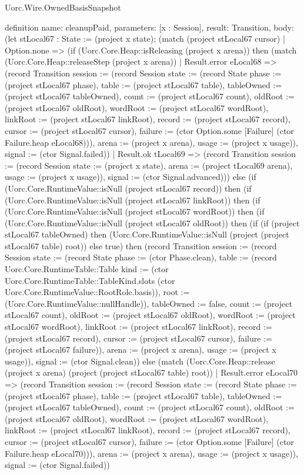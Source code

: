 \begin{lexlean}{Uorc.Wire.OwnedBasisSnapshot}
\begin{semanticmodule}
definition{
  name: cleanupPaid,
  parameters: [x : Session],
  result: Transition,
  body: (let stLocal67 : State := (project x state); (match (project stLocal67 cursor)
    | Option.none => (if (Uorc.Core.Heap::isReleasing (project x arena)) then (match (Uorc.Core.Heap::releaseStep (project x arena))
      | Result.error eLocal68 => (record Transition {session := (record Session {state := (record State {phase := (project stLocal67 phase), table := (project stLocal67 table), tableOwned := (project stLocal67 tableOwned), count := (project stLocal67 count), oldRoot := (project stLocal67 oldRoot), wordRoot := (project stLocal67 wordRoot), linkRoot := (project stLocal67 linkRoot), record := (project stLocal67 record), cursor := (project stLocal67 cursor), failure := (ctor Option.some [Failure] (ctor Failure.heap eLocal68))}), arena := (project x arena), usage := (project x usage)}), signal := (ctor Signal.failed)})
      | Result.ok tLocal69 => (record Transition {session := (record Session {state := (project x state), arena := (project tLocal69 arena), usage := (project x usage)}), signal := (ctor Signal.advanced)})) else (if (Uorc.Core.RuntimeValue::isNull (project stLocal67 record)) then (if (Uorc.Core.RuntimeValue::isNull (project stLocal67 linkRoot)) then (if (Uorc.Core.RuntimeValue::isNull (project stLocal67 wordRoot)) then (if (Uorc.Core.RuntimeValue::isNull (project stLocal67 oldRoot)) then (if (if (project stLocal67 tableOwned) then (Uorc.Core.RuntimeValue::isNull (project (project stLocal67 table) root)) else true) then (record Transition {session := (record Session {state := (record State {phase := (ctor Phase.clean), table := (record Uorc.Core.RuntimeTable::Table {kind := (ctor Uorc.Core.RuntimeTable::TableKind.slots (ctor Uorc.Core.RuntimeValue::RootRole.basis)), root := (Uorc.Core.RuntimeValue::nullHandle)}), tableOwned := false, count := (project stLocal67 count), oldRoot := (project stLocal67 oldRoot), wordRoot := (project stLocal67 wordRoot), linkRoot := (project stLocal67 linkRoot), record := (project stLocal67 record), cursor := (project stLocal67 cursor), failure := (project stLocal67 failure)}), arena := (project x arena), usage := (project x usage)}), signal := (ctor Signal.clean)}) else (match (Uorc.Core.Heap::release (project x arena) (project (project stLocal67 table) root))
      | Result.error eLocal70 => (record Transition {session := (record Session {state := (record State {phase := (project stLocal67 phase), table := (project stLocal67 table), tableOwned := (project stLocal67 tableOwned), count := (project stLocal67 count), oldRoot := (project stLocal67 oldRoot), wordRoot := (project stLocal67 wordRoot), linkRoot := (project stLocal67 linkRoot), record := (project stLocal67 record), cursor := (project stLocal67 cursor), failure := (ctor Option.some [Failure] (ctor Failure.heap eLocal70))}), arena := (project x arena), usage := (project x usage)}), signal := (ctor Signal.failed)})
}
\end{semanticmodule}
\end{lexlean}

